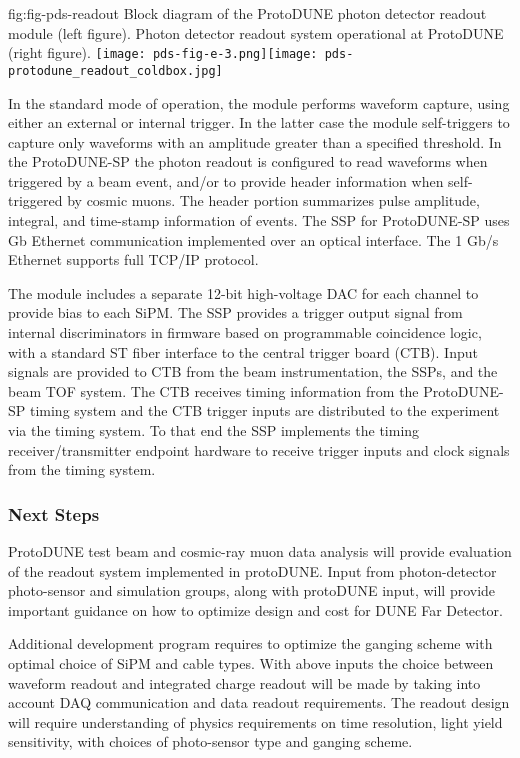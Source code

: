  \begin{dunefigure}
 {fig:fig-pds-readout}
 {Block diagram of the ProtoDUNE photon detector readout module (left figure). Photon detector readout system operational at ProtoDUNE (right figure). }
\texttt{[image: pds-fig-e-3.png]}\texttt{[image: pds-protodune\_readout\_coldbox.jpg]}
\end{dunefigure}

In the standard mode of operation, the module performs waveform capture, using either an external or internal trigger. In the latter case the 
module self-triggers to capture only waveforms with an amplitude greater than a specified threshold. In the ProtoDUNE-SP the photon readout 
is configured to read waveforms when triggered by a beam event, and/or to provide header information when self-triggered by cosmic muons.
The header portion summarizes pulse amplitude, integral, and time-stamp information of events. The SSP for ProtoDUNE-SP uses Gb Ethernet 
communication implemented over an optical interface. The 1 Gb/s Ethernet supports full TCP/IP protocol.  

The module includes a separate 12-bit high-voltage DAC for each channel to provide bias to each SiPM. The SSP provides a trigger output signal 
from internal discriminators in firmware based on programmable coincidence logic, with a standard ST fiber interface to the central trigger board (CTB).
Input signals are provided to CTB from the beam instrumentation, the SSPs, and the beam TOF system. The CTB receives timing information from 
the ProtoDUNE-SP timing system and the CTB trigger inputs are distributed to the experiment via the timing system.
To that end the SSP implements the timing receiver/transmitter endpoint hardware to receive trigger inputs and clock signals from the timing system.


\subsubsection{Next Steps}

ProtoDUNE test beam and cosmic-ray muon data analysis will provide evaluation of the readout system implemented in protoDUNE.
Input from photon-detector photo-sensor and simulation groups, along with protoDUNE input,  will provide important guidance on
how to optimize design and cost for DUNE Far Detector.

Additional development program requires to optimize the ganging scheme with optimal choice of SiPM and cable types. With above inputs 
the choice between waveform readout and integrated charge readout will be made by taking into account DAQ communication and data 
readout requirements. The readout design will require understanding of physics requirements on time resolution, light yield 
sensitivity, with choices of photo-sensor type and ganging scheme. 

